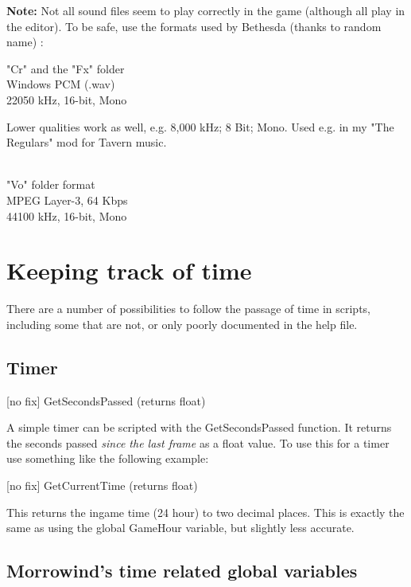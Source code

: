 \documentclass[
]{article}
\begin{document}
\textbf{Note:} Not all sound files seem to play correctly in the game
(although all play in the editor). To be safe, use the formats used by
Bethesda (thanks to random name) :

"Cr" and the "Fx" folder\\
Windows PCM (.wav)\\
22050 kHz, 16-bit, Mono

Lower qualities work as well, e.g. 8,000 kHz; 8 Bit; Mono. Used e.g. in
my "The Regulars" mod for Tavern music.\\
\strut \\
"Vo" folder format\\
MPEG Layer-3, 64 Kbps\\
44100 kHz, 16-bit, Mono

\hypertarget{keeping-track-of-time}{%
\section{\texorpdfstring{\hfill\break
Keeping track of
time}{ Keeping track of time}}\label{keeping-track-of-time}}

There are a number of possibilities to follow the passage of time in
scripts, including some that are not, or only poorly documented in the
help file.

\hypertarget{timer}{%
\subsection{Timer}\label{timer}}

{[}no fix{]} GetSecondsPassed (returns float)

A simple timer can be scripted with the GetSecondsPassed function. It
returns the seconds passed \emph{since the last frame} as a float value.
To use this for a timer use something like the following example:



{[}no fix{]} GetCurrentTime (returns float)

This returns the ingame time (24 hour) to two decimal places. This is
exactly the same as using the global GameHour variable, but slightly
less accurate.

\hypertarget{morrowinds-time-related-global-variables}{%
\subsection{Morrowind's time related global
variables}\label{morrowinds-time-related-global-variables}}
\end{document}
